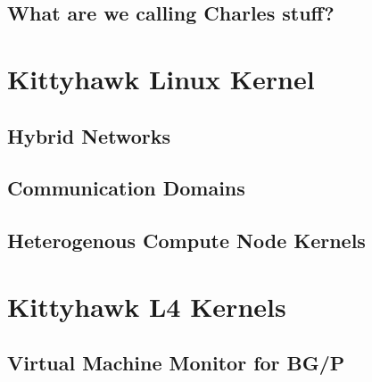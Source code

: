 \subsection{What are we calling Charles stuff?}
\section{Kittyhawk Linux Kernel}
\subsection{Hybrid Networks}
\subsection{Communication Domains}
\subsection{Heterogenous Compute Node Kernels}
\section{Kittyhawk L4 Kernels}
\subsection{Virtual Machine Monitor for BG/P}
